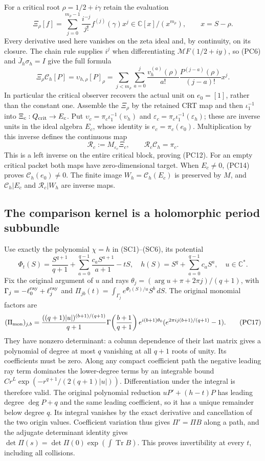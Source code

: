 For a critical root $\rho=1/2+i\gamma$ retain the evaluation
\[
 \Xi_\rho[f]=\sum_{j=0}^{m_\rho-1}
       \frac{i^{-j}}{j!}f^{(j)}(\gamma)x^j
       \in\mathbb C[x]/(x^{m_\rho}),\qquad x=S-\rho.
 \tag{PC13}
\]
Every derivative used here vanishes on the zeta ideal and, by
continuity, on its closure.  The chain rule supplies $i^j$ when
differentiating $\mathcal MF(1/2+iy)$, so (PC6) and
$\overline J_h\sigma_h=I$ give the full formula
\[
 \Xi_\rho\mathcal C_h[P]
 =\upsilon_{h,\rho}[P]_\rho
 =\sum_{j<m_\rho}\sum_{a=0}^j
   \frac{v_h^{(a)}(\rho)}{a!}
   \frac{P^{(j-a)}(\rho)}{(j-a)!}x^j.
 \tag{PC14}
\]
In particular the critical observer recovers the actual unit on
$e_0=[1]$, rather than the constant one.  Assemble the $\Xi_\rho$
by the retained CRT map and then $\iota_1^{-1}$ into
$\Xi_c:Q_{\rm crit}\to E_c$.  Put
$\upsilon_c=\pi_c\iota_1^{-1}(\upsilon_h)$ and
$\varepsilon_c=\pi_c\iota_1^{-1}(\varepsilon_h)$; these are
inverse units in the ideal algebra $E_c$, whose identity is
$e_c=\pi_c(e_0)$.  Multiplication by this inverse defines the continuous map
\[
 \mathcal R_c:=M_{\varepsilon_c}\Xi_c,
 \qquad \mathcal R_c\mathcal C_h=\pi_c.
 \tag{PC15}
\]
This is a left inverse on the entire critical block, proving (PC12).
For an empty critical packet both maps have zero-dimensional target.
When $E_c\ne0$, (PC14) proves $\mathcal C_h(e_0)\ne0$.
The finite image $W_h=\mathcal C_h(E_c)$ is preserved by $M$,
and $\mathcal C_h|E_c$ and $\mathcal R_c|W_h$ are inverse maps.

\subsection{The comparison kernel is a holomorphic period subbundle}

Use exactly the polynomial $\chi=h$ in (SC1)--(SC6), its potential
\[
 \Phi_t(S)=\frac{S^{q+1}}{q+1}
   +\sum_{a=0}^{q-1}\frac{c_aS^{a+1}}{a+1}-tS,
 \quad h(S)=S^q+\sum_{a=0}^{q-1}c_aS^a,
 \quad u\in\mathbb C^*.
 \tag{PC16}
\]
Fix the original argument of $u$ and rays
$\theta_j=(\arg u+\pi+2\pi j)/(q+1)$, with
$\Gamma_j=-\ell_0^{\rm ray}+\ell_j^{\rm ray}$ and
$\Pi_{jb}(t)=\int_{\Gamma_j}e^{\Phi_t(S)/u}S^b\,dS$.
The original monomial factors are
\[
 (\Pi_{\rm mon})_{j,b}=
 \frac{((q+1)|u|)^{(b+1)/(q+1)}}{q+1}
 \Gamma\!\left(\frac{b+1}{q+1}\right)e^{i(b+1)\theta_0}
 (e^{2\pi i j(b+1)/(q+1)}-1).
 \tag{PC17}
\]
They have nonzero determinant: a column dependence of their last
matrix gives a polynomial of degree at most $q$ vanishing at all
$q+1$ roots of unity.  Its coefficients must be zero.  Along any
compact coefficient path the negative leading ray term dominates
the lower-degree terms by an integrable bound
$Cr^L\exp(-r^{q+1}/(2(q+1)|u|))$.  Differentiation under the
integral is therefore valid.  The original polynomial reduction
$uP'+(h-t)P$ has leading degree $\deg P+q$ and the same leading
coefficient, so it has a unique remainder below degree $q$.
Its integral vanishes by the exact derivative and cancellation of
the two origin values.  Coefficient variation thus gives
$\Pi'=\Pi B$ along a path, and the adjugate determinant identity
gives $\det\Pi(s)=\det\Pi(0)\exp(\int\operatorname{Tr}B)$.
This proves invertibility at every $t$, including all collisions.

